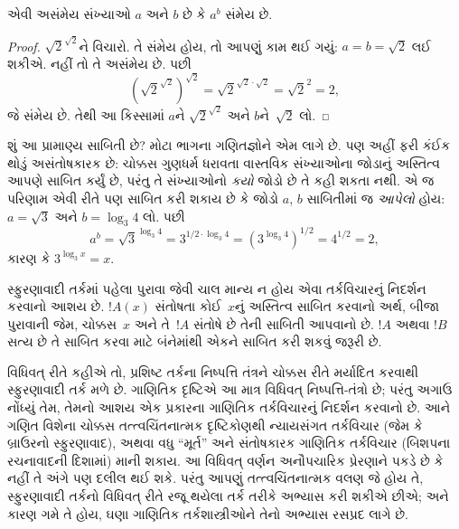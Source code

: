 \begin{thm}
એવી અસંમેય સંખ્યાઓ $a$ અને $b$ છે કે $a^b$ સંમેય છે.
\end{thm}

\begin{proof}
$\sqrt{2}^{\sqrt{2}}$ને વિચારો. તે સંમેય હોય, તો આપણું કામ
થઈ ગયું: $a = b = \sqrt{2}$ લઈ શકીએ. નહીં તો તે અસંમેય છે.
પછી
\[
(\sqrt{2}^{\sqrt{2}})^{\sqrt{2}} = \sqrt{2}^{\sqrt{2} \cdot
  \sqrt{2}} = \sqrt{2}^2 = 2,
\]
જે સંમેય છે. તેથી આ કિસ્સામાં $a$ને
$\sqrt{2}^{\sqrt{2}}$ અને $b$ને~$\sqrt 2$ લો.
\end{proof}

શું આ પ્રામાણ્ય સાબિતી છે? મોટા ભાગના ગણિતજ્ઞોને એમ લાગે છે.
પણ અહીં ફરી કંઈક થોડું અસંતોષકારક છે: ચોક્કસ ગુણધર્મ ધરાવતા
વાસ્તવિક સંખ્યાઓના જોડાનું અસ્તિત્વ આપણે સાબિત કર્યું છે,
પરંતુ તે સંખ્યાઓનો \emph{કયો} જોડો છે તે કહી શકતા નથી. એ જ
પરિણામ એવી રીતે પણ સાબિત કરી શકાય છે કે જોડો $a$, $b$
સાબિતીમાં જ \emph{આપેલો} હોય: $a = \sqrt{3}$ અને
$b = \log_3 4$ લો. પછી
\[
a^b = \sqrt{3}^{\log_3 4} = 3^{1/2 \cdot \log_3 4} = (3^{\log_3
  4})^{1/2} = 4^{1/2}= 2,
\]
કારણ કે $3^{\log_3 x} = x$.

સ્ફુરણાવાદી તર્કમાં પહેલા પુરાવા જેવી ચાલ માન્ય ન હોય એવા
તર્કવિચારનું નિદર્શન કરવાનો આશય છે. $!A(x)$ સંતોષતા કોઈ~$x$નું
અસ્તિત્વ સાબિત કરવાનો અર્થ, બીજા પુરાવાની જેમ, ચોક્કસ~$x$
અને તે~$!A$ સંતોષે છે તેની સાબિતી આપવાનો છે. $!A$ અથવા
$!B$ સત્ય છે તે સાબિત કરવા માટે બંનેમાંથી એકને સાબિત કરી
શકવું જરૂરી છે.

વિધિવત્ રીતે કહીએ તો, પ્રશિષ્ટ તર્કના નિષ્પત્તિ તંત્રને
ચોક્કસ રીતે મર્યાદિત કરવાથી સ્ફુરણાવાદી તર્ક મળે છે. ગાણિતિક
દૃષ્ટિએ આ માત્ર વિધિવત્ નિષ્પત્તિ-તંત્રો છે; પરંતુ અગાઉ
નોંધ્યું તેમ, તેમનો આશય એક પ્રકારના ગાણિતિક તર્કવિચારનું
નિદર્શન કરવાનો છે. આને ગણિત વિશેના ચોક્કસ તત્ત્વચિંતનાત્મક
દૃષ્ટિકોણથી ન્યાયસંગત તર્કવિચાર (જેમ કે બ્રાઉરનો સ્ફુરણાવાદ),
અથવા વધુ ``મૂર્ત'' અને સંતોષકારક ગાણિતિક તર્કવિચાર (બિશપના
રચનાવાદની દિશામાં) માની શકાય. આ વિધિવત્ વર્ણન અનૌપચારિક
પ્રેરણાને પકડે છે કે નહીં તે અંગે પણ દલીલ થઈ શકે. પરંતુ
આપણું તત્ત્વચિંતનાત્મક વલણ જે હોય તે, સ્ફુરણાવાદી તર્કનો
વિધિવત્ રીતે રજૂ થયેલા તર્ક તરીકે અભ્યાસ કરી શકીએ છીએ;
અને કારણ ગમે તે હોય, ઘણા ગાણિતિક તર્કશાસ્ત્રીઓને તેનો
અભ્યાસ રસપ્રદ લાગે છે.
\endgroup


\begingroup
\makeatletter{}\makeatother


\label{guunit:OLP-0494}


